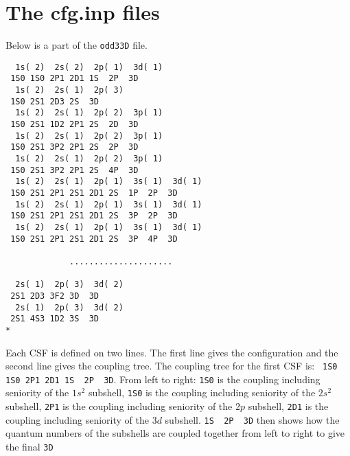 \documentclass[fleqn,10pt]{book}
\begin{document}
\section{The cfg.inp files}
Below is a part of the \verb+odd33D+ file.
\begin{verbatim}
  1s( 2)  2s( 2)  2p( 1)  3d( 1)
 1S0 1S0 2P1 2D1 1S  2P  3D  
  1s( 2)  2s( 1)  2p( 3)
 1S0 2S1 2D3 2S  3D 
  1s( 2)  2s( 1)  2p( 2)  3p( 1)
 1S0 2S1 1D2 2P1 2S  2D  3D  
  1s( 2)  2s( 1)  2p( 2)  3p( 1)
 1S0 2S1 3P2 2P1 2S  2P  3D  
  1s( 2)  2s( 1)  2p( 2)  3p( 1)
 1S0 2S1 3P2 2P1 2S  4P  3D  
  1s( 2)  2s( 1)  2p( 1)  3s( 1)  3d( 1)
 1S0 2S1 2P1 2S1 2D1 2S  1P  2P  3D  
  1s( 2)  2s( 1)  2p( 1)  3s( 1)  3d( 1)
 1S0 2S1 2P1 2S1 2D1 2S  3P  2P  3D  
  1s( 2)  2s( 1)  2p( 1)  3s( 1)  3d( 1)
 1S0 2S1 2P1 2S1 2D1 2S  3P  4P  3D  

             .....................
             
  2s( 1)  2p( 3)  3d( 2)
 2S1 2D3 3F2 3D  3D
  2s( 1)  2p( 3)  3d( 2)
 2S1 4S3 1D2 3S  3D
*            
\end{verbatim}
Each CSF is defined on two lines. The first line gives the configuration and the second line gives the coupling tree. The coupling tree for the first CSF is: \verb+ 1S0 1S0 2P1 2D1 1S  2P  3D+.
From left to right: \verb+1S0+ is the coupling including seniority of the $1s^2$ subshell, \verb+1S0+ is the coupling including seniority of the $2s^2$ subshell, \verb+2P1+ is the coupling including seniority of the $2p$ subshell,
\verb+2D1+ is the coupling including seniority of the $3d$ subshell.  \verb+1S  2P  3D+ then shows how the quantum numbers of the subshells are coupled together from left to right to give the final \verb+3D+
\end{document}
